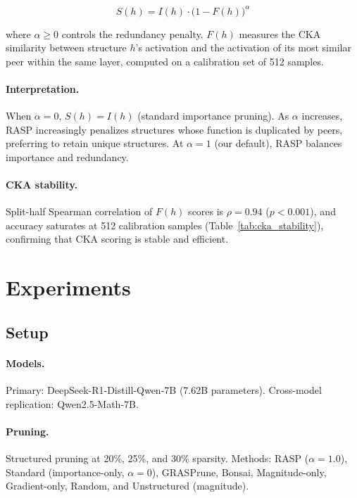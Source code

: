 \documentclass[11pt]{article}
\begin{document}
\begin{equation}
    S(h) = I(h) \cdot \big(1 - F(h)\big)^\alpha
    \label{eq:rasp}
\end{equation}

where $\alpha \geq 0$ controls the redundancy penalty.
$F(h)$ measures the CKA similarity between structure $h$'s activation and the activation of its most similar peer within the same layer, computed on a calibration set of 512 samples.

\paragraph{Interpretation.}
When $\alpha{=}0$, $S(h){=}I(h)$ (standard importance pruning).
As $\alpha$ increases, RASP increasingly penalizes structures whose function is duplicated by peers, preferring to retain unique structures.
At $\alpha{=}1$ (our default), RASP balances importance and redundancy.

\paragraph{CKA stability.}
Split-half Spearman correlation of $F(h)$ scores is $\rho{=}0.94$ ($p{<}0.001$), and accuracy saturates at 512 calibration samples (Table~\ref{tab:cka_stability}), confirming that CKA scoring is stable and efficient.

\section{Experiments}

\subsection{Setup}

\paragraph{Models.}
Primary: DeepSeek-R1-Distill-Qwen-7B (7.62B parameters).
Cross-model replication: Qwen2.5-Math-7B.

\paragraph{Pruning.}
Structured pruning at 20\%, 25\%, and 30\% sparsity.
Methods: RASP ($\alpha{=}1.0$), Standard (importance-only, $\alpha{=}0$), GRASPrune, Bonsai, Magnitude-only, Gradient-only, Random, and Unstructured (magnitude).
\end{document}
